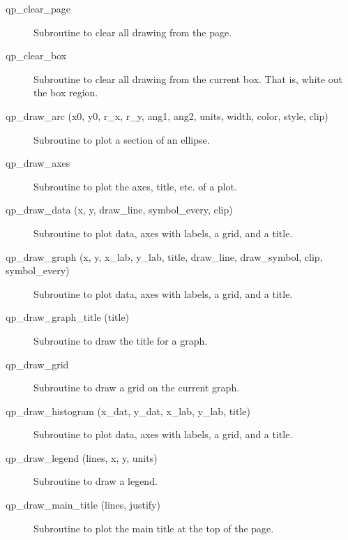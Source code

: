 \begin{description}

\item[qp\_clear\_page] \Newline 
     Subroutine to clear all drawing from the page.

\item[qp\_clear\_box] \Newline 
     Subroutine to clear all drawing from the current box.
     That is, white out the box region.

\item[qp\_draw\_arc (x0, y0, r\_x, r\_y, ang1, ang2, 
                     units, width, color, style, clip) ] \Newline 
     Subroutine to plot a section of an ellipse.

\item[qp\_draw\_axes] \Newline 
     Subroutine to plot the axes, title, etc. of a plot.

\item[qp\_draw\_data (x, y, draw\_line, symbol\_every, clip)] \Newline
     Subroutine to plot data, axes with labels, a grid, and a title.

\item[qp\_draw\_graph (x, y, x\_lab, y\_lab, title, 
                  draw\_line, draw\_symbol, clip, symbol\_every) ] \Newline 
     Subroutine to plot data, axes with labels, a grid, and a title.

\item[qp\_draw\_graph\_title (title)] \Newline 
     Subroutine to draw the title for a graph.

\item[qp\_draw\_grid] \Newline 
     Subroutine to draw a grid on the current graph.

\item[qp\_draw\_histogram (x\_dat, y\_dat, x\_lab, y\_lab, title)] \Newline 
     Subroutine to plot data, axes with labels, a grid, and a title.

\item[qp\_draw\_legend (lines, x, y, units)] \Newline 
     Subroutine to draw a legend.

\item[qp\_draw\_main\_title (lines, justify)] \Newline 
     Subroutine to plot the main title at the top of the page.


\end{description}
